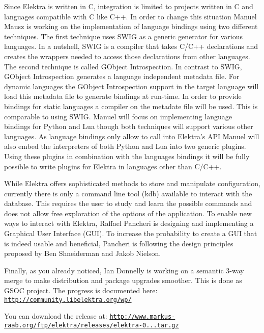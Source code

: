 Since Elektra is written in C, integration is limited to projects written in C and languages compatible with C like C++. In order to change this situation Manuel Mausz is working on the implementation of language bindings using two different techniques. The first technique uses S\+W\+IG as a generic generator for various languages. In a nutshell, S\+W\+IG is a compiler that takes C/\+C++ declarations and creates the wrappers needed to access those declarations from other languages. The second technique is called G\+Object Introspection. In contrast to S\+W\+IG, G\+Object Introspection generates a language independent metadata file. For dynamic languages the G\+Object Introspection support in the target language will load this metadata file to generate bindings at run-\/time. In order to provide bindings for static languages a compiler on the metadate file will be used. This is comparable to using S\+W\+IG. Manuel will focus on implementing language bindings for Python and Lua though both techniques will support various other languages. As language bindings only allow to call into Elektra’s A\+PI Manuel will also embed the interpreters of both Python and Lua into two generic plugins. Using these plugins in combination with the languages bindings it will be fully possible to write plugins for Elektra in languages other than C/\+C++.

While Elektra offers sophisticated methods to store and manipulate configuration, currently there is only a command line tool (kdb) available to interact with the database. This requires the user to study and learn the possible commands and does not allow free exploration of the options of the application. To enable new ways to interact with Elektra, Raffael Pancheri is designing and implementing a Graphical User Interface (G\+UI). To increase the probability to create a G\+UI that is indeed usable and beneficial, Pancheri is following the design principles proposed by Ben Shneiderman and Jakob Nielson.

Finally, as you already noticed, Ian Donnelly is working on a semantic 3-\/way merge to make distribution and package upgrades smoother. This is done as G\+S\+OC project. The progress is documented here\+: \href{http://community.libelektra.org/wp/}{\tt http\+://community.\+libelektra.\+org/wp/}

You can download the release at\+: \href{http://www.markus-raab.org/ftp/elektra/releases/elektra-0.8.6.tar.gz}{\tt http\+://www.\+markus-\/raab.\+org/ftp/elektra/releases/elektra-\/0...\+tar.\+gz}


